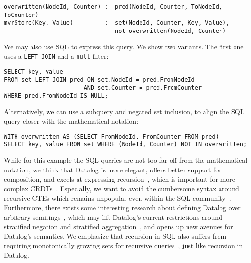 \documentclass{article}
\newcommand{\code}[1]{\texttt{#1}}
\begin{document}
\begin{small}
	\begin{verbatim}
overwritten(NodeId, Counter) :- pred(NodeId, Counter, ToNodeId, ToCounter)
mvrStore(Key, Value)         :- set(NodeId, Counter, Key, Value),
                                not overwritten(NodeId, Counter)
\end{verbatim}
\end{small}

We may also use SQL to express this query. We show two variants.
The first one uses a \code{LEFT JOIN} and a \code{null} filter:

\begin{small}
	\begin{verbatim}
SELECT key, value
FROM set LEFT JOIN pred ON set.NodeId = pred.FromNodeId
                       AND set.Counter = pred.FromCounter
WHERE pred.FromNodeId IS NULL;
\end{verbatim}
\end{small}

Alternatively, we can use a subquery and negated set inclusion,
to align the SQL query closer with the mathematical notation:

\begin{small}
	\begin{verbatim}
WITH overwritten AS (SELECT FromNodeId, FromCounter FROM pred)
SELECT key, value FROM set WHERE (NodeId, Counter) NOT IN overwritten;
\end{verbatim}
\end{small}

While for this example the SQL queries are not too far off from the mathematical
notation, we think that Datalog is more elegant, offers better support for
composition, and excels at expressing recursion~\cite{abo2024convergence},
which is important for more complex CRDTs~\cite{kleppmann2018data}.
Especially, we want to avoid the cumbersome syntax around recursive
CTEs which remains unpopular even within the SQL
community~\cite{neumann2024critique, hirn2023fix, mcsherry2022recursion}.
Furthermore, there exists some interesting research about defining Datalog
over arbitrary semirings~\cite{abo2024convergence, khamis2022datalog},
which may lift Datalog's current restrictions around stratified negation and
stratified aggregation~\cite{green2013datalog}, and opens up new avenues for
Datalog's semantics.
We emphasize that recursion in SQL also suffers from requiring
monotonically growing sets for recursive queries~\cite{hirn2023fix},
just like recursion in Datalog.
\end{document}
